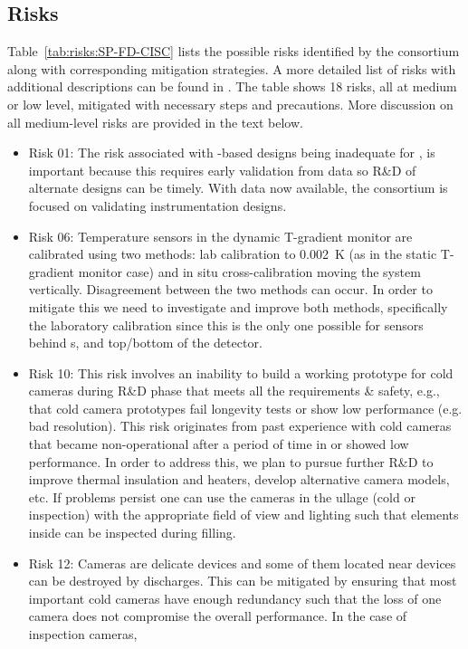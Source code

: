  

\subsection{Risks}

Table~\ref{tab:risks:SP-FD-CISC}  %
lists the possible risks identified by the  consortium along with corresponding mitigation strategies. %
A more detailed list of risks with additional descriptions can be found in \cite{bib:docdb7192}. The table shows 18 risks, all at medium or low level, mitigated with necessary steps and precautions. More discussion on all medium-level risks are provided in the text below. 
\begin{itemize}
    \item Risk 01: The risk associated with -based designs being inadequate for , is important because this requires early validation from  data so R\&D of alternate designs can be timely. With  data now available, the consortium is focused on validating instrumentation designs. 
    \item Risk 06: Temperature sensors in the dynamic T-gradient monitor are calibrated using two methods: lab calibration to \SI{0.002}{K}  (as in the static T-gradient monitor case) and in situ cross-calibration moving the system vertically. Disagreement between the two methods can occur. In order to mitigate this we need to investigate and improve both methods, specifically the laboratory calibration since this is the only one possible for sensors behind s, and top/bottom of the detector.  
    \item Risk 10: This risk involves an inability to build a working prototype for cold cameras during R\&D phase that meets all the requirements \& safety, e.g., that cold camera prototypes fail longevity tests or show low performance (e.g. bad resolution). This risk originates from past experience with cold cameras that became non-operational after a period of time in  or showed low performance. In order to address this, we plan to pursue further R\&D to improve thermal insulation and heaters, develop alternative camera models, etc. If problems persist one can use the cameras in the ullage (cold or inspection) with the appropriate field of view and lighting such that elements inside  can be inspected during filling.
    \item Risk 12: Cameras are delicate devices and some of them located near  devices can be destroyed by  discharges. This can be mitigated by ensuring that most important cold cameras have enough redundancy such that the loss of one camera does not compromise the overall performance. In the case of inspection cameras, %

\end{itemize}
